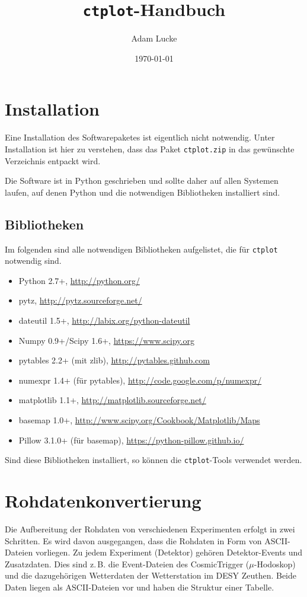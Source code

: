 \documentclass[version=last,
	a4paper,			%
	pagesize, 			%
	11pt,				%
	BCOR1cm,			%
	DIV12,	 			%
	pointlessnumbers,   %
	halfparskip,		%
]{scrreprt}
\newcommand{\zb}{z.\,B.\xspace}
\begin{document}
\title{\texttt{ctplot}-Handbuch}
\author{Adam Lucke}
\date{\today}
\maketitle

\tableofcontents
\chapter{Installation}
Eine Installation des Softwarepaketes ist eigentlich nicht notwendig. Unter Installation ist hier zu verstehen, dass das Paket \texttt{ctplot.zip} in das gewünschte Verzeichnis entpackt wird.

Die Software ist in Python geschrieben und sollte daher auf allen Systemen laufen, auf denen Python und die notwendigen Bibliotheken installiert sind.

\section{Bibliotheken}
Im folgenden sind alle notwendigen Bibliotheken aufgelistet, die für \texttt{ctplot} notwendig sind.
\begin{itemize}
  \item Python 2.7+, \url{http://python.org/}
  \item pytz, \url{http://pytz.sourceforge.net/}
  \item dateutil 1.5+, \url{http://labix.org/python-dateutil}
  \item Numpy 0.9+/Scipy 1.6+, \url{https://www.scipy.org}
  \item pytables 2.2+ (mit zlib), \url{http://pytables.github.com}
  \item numexpr 1.4+ (für pytables), \url{http://code.google.com/p/numexpr/}
  \item matplotlib 1.1+, \url{http://matplotlib.sourceforge.net/}
  \item basemap 1.0+, \url{http://www.scipy.org/Cookbook/Matplotlib/Maps}
  \item Pillow 3.1.0+ (für basemap), \url{https://python-pillow.github.io/}
\end{itemize}

Sind diese Bibliotheken installiert, so können die \texttt{ctplot}-Tools verwendet werden.


\chapter{Rohdatenkonvertierung}
Die Aufbereitung der Rohdaten von verschiedenen Experimenten erfolgt in zwei Schritten. Es wird davon ausgegangen, dass die Rohdaten in Form von ASCII-Dateien vorliegen. Zu jedem Experiment (Detektor) gehören Detektor-Events und Zusatzdaten. Dies sind \zb die Event-Dateien des CosmicTrigger ($\mu$-Hodoskop) und die dazugehörigen Wetterdaten der Wetterstation im DESY Zeuthen. Beide Daten liegen als ASCII-Dateien vor und haben die Struktur einer Tabelle.
\end{document}
